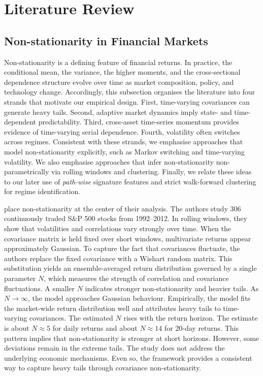 
\chapter{Literature Review} \label{Chapter: Conclusions}

\section{Non-stationarity in Financial Markets}

Non-stationarity is a defining feature of financial returns. In practice, the conditional mean, the variance, the higher moments, and the cross-sectional dependence structure evolve over time as market composition, policy, and technology change. Accordingly, this subsection organises the literature into four strands that motivate our empirical design. First, time-varying covariances can generate heavy tails. Second, adaptive market dynamics imply state- and time-dependent predictability. Third, cross-asset time-series momentum provides evidence of time-varying serial dependence. Fourth, volatility often switches across regimes. Consistent with these strands, we emphasise approaches that model non-stationarity explicitly, such as Markov switching and time-varying volatility. We also emphasise approaches that infer non-stationarity non-parametrically via rolling windows and clustering. Finally, we relate these ideas to our later use of \emph{path-wise} signature features and strict walk-forward clustering for regime identification.


\cite{Schmitt_2013} place non-stationarity at the center of their analysis. The authors study 306 continuously traded S\&P 500 stocks from 1992--2012. In rolling windows, they show that volatilities and correlations vary strongly over time. When the covariance matrix is held fixed over short windows, multivariate returns appear approximately Gaussian. To capture the fact that covariances fluctuate, the authors replace the fixed covariance with a Wishart random matrix. This substitution yields an ensemble-averaged return distribution governed by a single parameter $N$, which measures the strength of correlation and covariance fluctuations. A smaller $N$ indicates stronger non-stationarity and heavier tails. As $N \rightarrow \infty$, the model approaches Gaussian behaviour. Empirically, the model fits the market-wide return distribution well and attributes heavy tails to time-varying covariances. The estimated $N$ rises with the return horizon. The estimate is about $N \approx 5$ for daily returns and about $N \approx 14$ for 20-day returns. This pattern implies that non-stationarity is stronger at short horizons. However, some deviations remain in the extreme tails. The study does not address the underlying economic mechanisms. Even so, the framework provides a consistent way to capture heavy tails through covariance non-stationarity.


